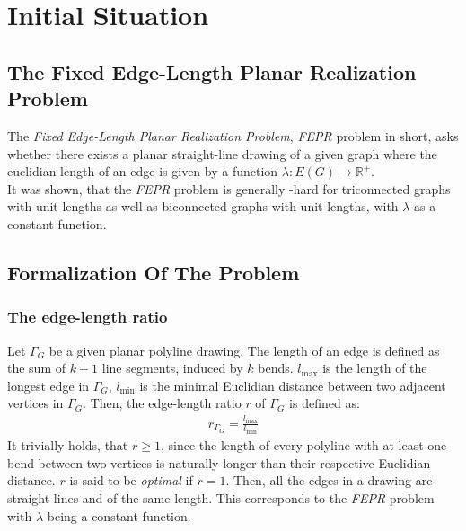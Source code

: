 \section{Initial Situation}\label{section:initial_situation}

\subsection{The Fixed Edge-Length Planar Realization Problem}

The \emph{Fixed Edge-Length Planar Realization Problem}, \emph{FEPR} problem in short, asks whether there exists a planar straight-line drawing of a given graph where the euclidian length of an edge is given by a function $\lambda: E(G) \to \mathbb{R}^+$.
\\
It was shown, that the \emph{FEPR} problem is generally \NP-hard for triconnected graphs with unit lengths as well as biconnected graphs with unit lengths, with $\lambda$ as a constant function. \cite[P. 2]{straight-line_2-trees}

\subsection{Formalization Of The Problem}
\subsubsection{The edge-length ratio}
Let $\Gamma_G$ be a given planar polyline drawing. The length of an edge is defined as the sum of $k+1$ line segments, induced by $k$ bends. $l_{\max}$ is the length of the longest edge in $\Gamma_G$, $l_{\min}$ is the minimal Euclidian distance between two adjacent vertices in $\Gamma_G$. Then, the edge-length ratio $r$ of $\Gamma_G$ is defined as:
\begin{align}
	r_{\Gamma_G} = \frac{l_{\max}}{l_{\min}} 
\end{align}
It trivially holds, that $r\geq1$, since the length of every polyline with at least one bend between two vertices is naturally longer than their respective Euclidian distance. $r$ is said to be \emph{optimal} if $r=1$. Then, all the edges in a drawing are straight-lines and of the same length. This corresponds to the \emph{FEPR} problem with $\lambda$ being a constant function.
